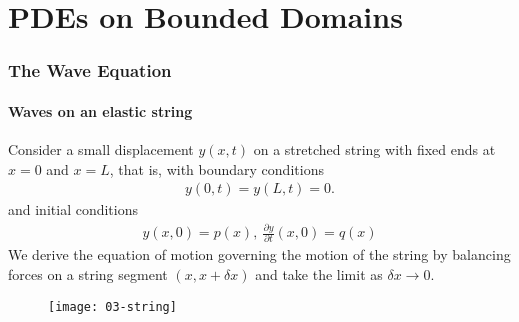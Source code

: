 \part{PDEs on Bounded Domains}

\section{The Wave Equation}

\subsection{Waves on an elastic string}
Consider a small displacement $y(x,t)$ on a stretched string with fixed ends at $x = 0$ and $x = L$, that is, with boundary conditions
\begin{align} \label{eq:3.1}
	y(0,t) = y(L,t) = 0.
\end{align} 
and initial conditions
\begin{align} \label{eq:3.2}
	y(x, 0) = p(x),\ \frac{\partial y}{\partial t}(x,0) = q(x)
\end{align} 
We derive the equation of motion governing the motion of the string by balancing forces on a string segment $(x,x+\delta x)$ and take the limit as $\delta x \to 0$.
\begin{figure}[h] 
	\centering 
	\texttt{[image: 03-string]} 
\end{figure}

